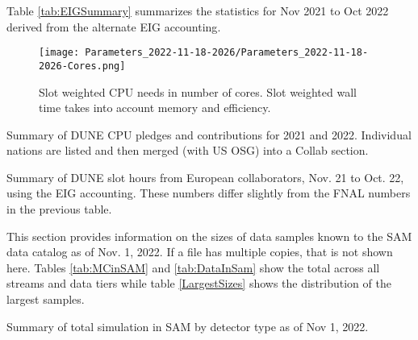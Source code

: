 \documentclass[12pt]{article}
\begin{document}
Table \ref{tab:EIGSummary} summarizes the statistics for Nov 2021 to Oct 2022 derived from the alternate EIG accounting\cite{EIG2022}.  

\begin{figure}[h]
\centering\texttt{[image: Parameters\_2022-11-18-2026/Parameters\_2022-11-18-2026-Cores.png]}
\caption{Slot weighted CPU needs in number of cores. Slot weighted wall time takes into account memory and efficiency.}\label{fig:CoresMain}
\end{figure}

\begin{table}[ht]
\centering{}
\caption{Summary  of DUNE CPU pledges and contributions for 2021 and 2022.  Individual nations are listed and then merged (with US OSG) into a Collab section.  } \label{tab:CPUUsage}
\end{table}

\begin{table}[ht]
\centering{}
\caption{Summary  of DUNE slot hours from European collaborators, Nov. 21 to Oct. 22, using the EIG accounting\cite{EIG2022}. These numbers differ slightly from the FNAL numbers in the previous table.} \label{tab:EIGSummary}
\end{table}


%



\clearpage
{}\label{storage}

This section provides information on the sizes of data samples known to the SAM data catalog as of Nov. 1, 2022.  If a file has multiple copies, that is not shown here.  Tables \ref{tab:MCinSAM} and \ref{tab:DataInSam} show the total across all streams and data tiers while table \ref{LargestSizes} shows the distribution of the largest samples.  


\begin{table}[ht]
 \centering{}
\caption{Summary  of total simulation in SAM by detector type as of Nov 1, 2022.} 
\label{tab:MCinSAM}
\end{table}
\end{document}

